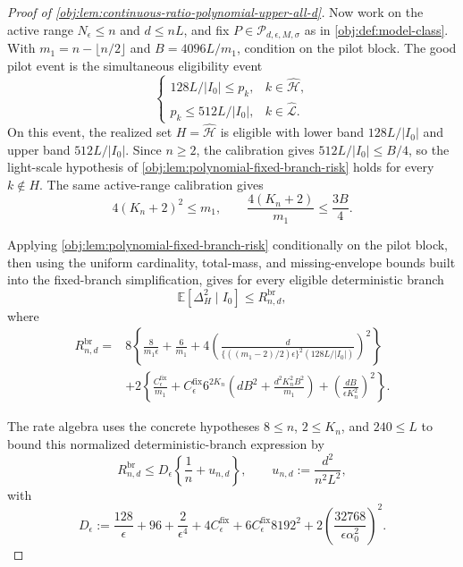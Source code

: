 \documentclass[11pt]{article}
\begin{document}
\begin{proof}[Proof of \cref{obj:lem:continuous-ratio-polynomial-upper-all-d}]
Now work on the active range \(N_\epsilon\le n\) and \(d\le nL\), and fix \(P\in\mathcal P_{d,\epsilon,M,\sigma}\) as in \cref{obj:def:model-class}.  With \(m_1=n-\lfloor n/2\rfloor\) and \(B=4096L/m_1\), condition on the pilot block.  The good pilot event is the simultaneous eligibility event
\[
\left\{
\begin{array}{ll}
128L/|I_0|\le p_k, & k\in\widehat{\mathcal H},\\
p_k\le 512L/|I_0|, & k\in\widehat{\mathcal L}.
\end{array}
\right.
\]
On this event, the realized set \(H=\widehat{\mathcal H}\) is eligible with lower band \(128L/|I_0|\) and upper band \(512L/|I_0|\).  Since \(n\ge2\), the calibration gives \(512L/|I_0|\le B/4\), so the light-scale hypothesis of \cref{obj:lem:polynomial-fixed-branch-risk} holds for every \(k\notin H\).  The same active-range calibration gives
\[
4(K_n+2)^2\le m_1,
\qquad
\frac{4(K_n+2)}{m_1}\le \frac{3B}{4}.
\]

Applying \cref{obj:lem:polynomial-fixed-branch-risk} conditionally on the pilot block, then using the uniform cardinality, total-mass, and missing-envelope bounds built into the fixed-branch simplification, gives for every eligible deterministic branch
\[
\mathbb E\!\left[\Delta_H^2\mid I_0\right]
\le R_{n,d}^{\mathrm{br}},
\]
where
\[
\begin{aligned}
R_{n,d}^{\mathrm{br}}
={}&8\left\{
\frac{8}{m_1\epsilon}+\frac{6}{m_1}
+4\left(
\frac{d}{\{((m_1-2)/2)\epsilon\}^2(128L/|I_0|)}
\right)^2
\right\}\\
&+2\left\{
\frac{C_{\epsilon}^{\mathrm{fix}}}{m_1}
+C_{\epsilon}^{\mathrm{fix}}6^{2K_n}
\left(dB^2+\frac{d^2K_n^2B^2}{m_1}\right)
+\left(\frac{dB}{\epsilon K_n^2}\right)^2
\right\}.
\end{aligned}
\]

The rate algebra uses the concrete hypotheses \(8\le n\), \(2\le K_n\), and \(240\le L\) to bound this normalized deterministic-branch expression by
\[
R_{n,d}^{\mathrm{br}}
\le
D_\epsilon\left\{\frac1n+u_{n,d}\right\},
\qquad
u_{n,d}:=\frac{d^2}{n^2L^2},
\]
with
\[
D_\epsilon
:=
\frac{128}{\epsilon}+96+\frac{2}{\epsilon^4}
+4C_{\epsilon}^{\mathrm{fix}}
+6C_{\epsilon}^{\mathrm{fix}}8192^2
+2\left(\frac{32768}{\epsilon\alpha_0^2}\right)^2.
\]


\end{proof}
\end{document}
